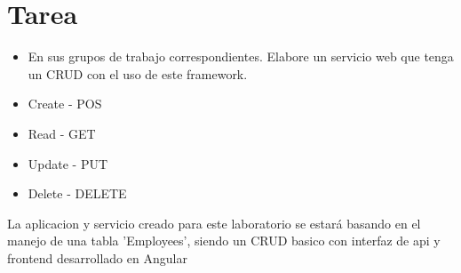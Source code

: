 \documentclass{article}
\begin{document}
\section{Tarea}
        \begin{itemize}
            \item En sus grupos de trabajo correspondientes. Elabore un servicio web que tenga un CRUD con el uso de este framework.
            \item Create - POS        
            \item Read - GET
            \item Update - PUT
            \item Delete - DELETE
        \end{itemize}

    La aplicacion y servicio creado para este laboratorio se estará basando en el manejo de una tabla 'Employees', siendo un CRUD basico con interfaz de api y frontend desarrollado en Angular
        
\end{document}
